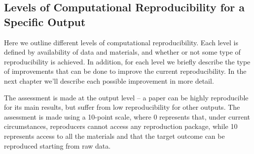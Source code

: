 \documentclass[]{book}
\begin{document}
\hypertarget{levels-of-computational-reproducibility-for-a-specific-output}{%
\subsection{Levels of Computational Reproducibility for a Specific Output}\label{levels-of-computational-reproducibility-for-a-specific-output}}

Here we outline different levels of computational reproducibility. Each level is defined by availability of data and materials, and whether or not some type of reproducibility is achieved. In addition, for each level we briefly describe the type of improvements that can be done to improve the current reproducibility. In the next chapter we'll describe each possible improvement in more detail.

The assessment is made at the output level -- a paper can be highly reproducible for its main results, but suffer from low reproducibility for other outputs. The assessment is made using a 10-point scale, where 0 represents that, under current circumstances, reproducers cannot access any reproduction package, while 10 represents access to all the materials and that the target outcome can be reproduced starting from raw data.
\end{document}
